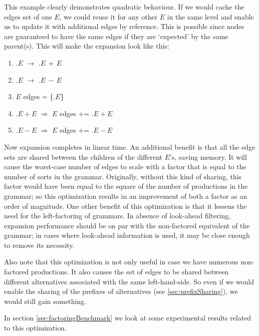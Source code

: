 \documentclass[a4paper,10pt]{article}
\begin{document}
This example clearly demonstrates quadratic behaviour. If we would cache the edges set of one $E$, we could reuse it for any other $E$ in the same level and enable us to update it with additional edges by reference. This is possible since nodes are guaranteed to have the same edges if they are `expected' by the same parent(s). This will make the expansion look like this:
\begin{enumerate}
 \setlength{\itemsep}{0pt}
 \setlength{\parskip}{0pt}
 \setlength{\parsep}{0pt}
 
 \item $.E$ $\rightarrow$ $.E\,+\,E$
 \item $.E$ $\rightarrow$ $.E\,-\,E$
 \item $E$ edges = \{$.E$\}
 \item $.E+E$ $\Rightarrow$ $E$ edges += $.E+E$
 \item $.E-E$ $\Rightarrow$ $E$ edges += $.E-E$
\end{enumerate}
Now expansion completes in linear time. An additional benefit is that all the edge sets are shared between the children of the different $E$'s, saving memory. It will cause the worst-case number of edges to scale with a factor that is equal to the number of sorts in the grammar. Originally, without this kind of sharing, this factor would have been equal to the square of the number of productions in the grammar; so this optimization results in an improvement of both a factor as an order of magnitude. One other benefit of this optimization is that it lessens the need for the left-factoring of grammars. In absence of look-ahead filtering, expansion performance should be on par with the non-factored equivalent of the grammar; in cases where look-ahead information is used, it may be close enough to remove its necessity.

Also note that this optimization is not only useful in case we have numerous non-factored productions. It also causes the set of edges to be shared between different alternatives associated with the same left-hand-side. So even if we would enable the sharing of the prefixes of alternatives (see \ref{sec:prefixSharing}), we would still gain something.

In section \ref{sec:factoringBenchmark} we look at some experimental results related to this optimization.
\end{document}
